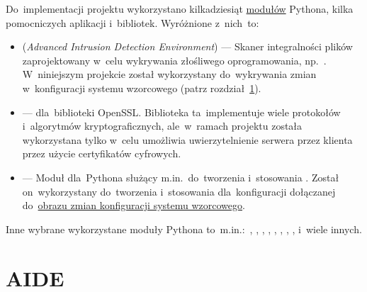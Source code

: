 \documentclass[thesis]{subfiles}
\begin{document}
Do~implementacji projektu wykorzystano kilkadziesiąt \href{https://docs.python.org/dev/tutorial/modules.html}{modułów} Pythona, kilka pomocniczych aplikacji i~bibliotek. Wyróżnione z~nich~to:\mynobreakpar %
\begin{itemize}
	\item {} (\emph{Advanced Intrusion Detection Environment}) --- Skaner integralności plików zaprojektowany w~celu wykrywania złośliwego oprogramowania, np.~. W~niniejszym projekcie został wykorzystany do~wykrywania zmian w~konfiguracji systemu wzorcowego (patrz rozdział~\ref{sec:aide}).
	\item {} ---  dla~biblioteki OpenSSL. Biblioteka ta~implementuje wiele protokołów i~algorytmów kryptograficznych, ale~w~ramach projektu została wykorzystana tylko w~celu umożliwia uwierzytelnienie serwera przez klienta przez użycie certyfikatów cyfrowych.
	\item {} --- Moduł dla~Pythona służący m.in.~do~tworzenia i~stosowania . Został on~wykorzystany do~tworzenia i~stosowania  dla~konfiguracji dołączanej do~\hyperref[sec:obraz-zmian-konfiguracji]{obrazu zmian konfiguracji systemu wzorcowego}.
\end{itemize}

Inne wybrane wykorzystane moduły Pythona to~m.in.:~, , , , , , , ,  i~wiele innych.


\section{AIDE}
\label{sec:aide}
\end{document}
